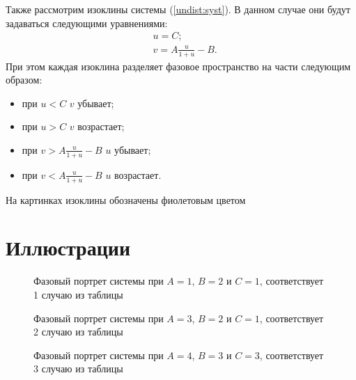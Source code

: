 \documentclass{article}
\begin{document}
Также рассмотрим изоклины системы (\ref{undist:syst}). В данном случае они будут задаваться следующими уравнениями:
\begin{equation*}
\begin{aligned}
&u = C;\\
&v = A \frac{u}{1 + u} - B.
\end{aligned}
\end{equation*}
При этом каждая изоклина разделяет фазовое пространство на части следующим образом:
\begin{itemize}

\item при $u < C$ $v$ убывает;

\item при $u > C$ $v$ возрастает;

\item при $v > A \frac{u}{1 + u} - B$ $u$ убывает;

\item при $v < A \frac{u}{1 + u} - B$ $u$ возрастает.

\end{itemize}
На картинках изоклины обозначены фиолетовым цветом

\clearpage

\section{Иллюстрации}
 \begin{figure}[h!]
\begin{center}
\caption{Фазовый портрет системы при $A=1$, $B=2$ и $C = 1$, соответствует 1 случаю из таблицы}
\label{fig_1}
\end{center}
\end{figure}

 \begin{figure}[h!]
\begin{center}
\caption{Фазовый портрет системы при $A=3$, $B=2$ и $C = 1$, соответствует 2 случаю из таблицы}
\label{fig_2}
\end{center}
\end{figure}

 \begin{figure}[h!]
\begin{center}
\caption{Фазовый портрет системы при $A=4$, $B=3$ и $C = 3$, соответствует 3 случаю из таблицы}
\label{fig_3}
\end{center}
\end{figure}
\end{document}
